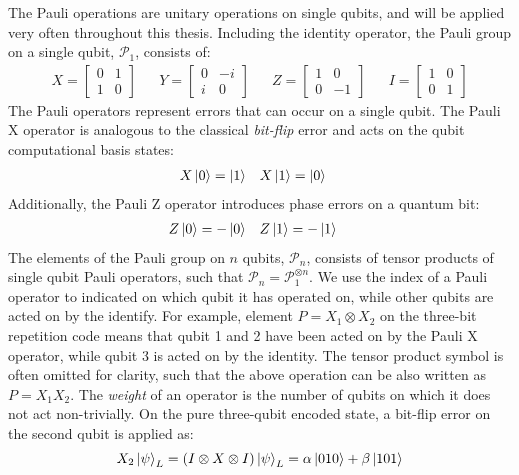 The Pauli operations are unitary operations on single qubits, and will be applied very often throughout this thesis. Including the identity operator, the Pauli group on a single qubit, $\mathcal{P}_1$, consists of:
\begin{align}
  X = \begin{bmatrix} 0 & 1 \\ 1 & 0 \end{bmatrix} &&
  Y = \begin{bmatrix} 0 & -i \\ i & 0 \end{bmatrix} &&
  Z = \begin{bmatrix} 1 & 0 \\ 0 & -1 \end{bmatrix} &&
  I = \begin{bmatrix} 1 & 0 \\ 0 & 1 \end{bmatrix}
\end{align}
The Pauli operators represent errors that can occur on a single qubit. The Pauli X operator is analogous to the classical \emph{bit-flip} error and acts on the qubit computational basis states:
\begin{align}\label{eqq:qec_bitflip}
  & X\ket{0} = \ket{1} && X\ket{1} = \ket{0} &
\end{align}
Additionally, the Pauli Z operator introduces phase errors on a quantum bit:
\begin{align}\label{eq:eqc_phaseflip}
  & Z\ket{0} = -\ket{0} && Z\ket{1} = -\ket{1} &
\end{align}
The elements of the Pauli group on $n$ qubits, $\mathcal{P}_n$, consists of tensor products of single qubit Pauli operators, such that  $\mathcal{P}_n = \mathcal{P}_1^{\otimes n}$. We use the index of a Pauli operator to indicated on which qubit it has operated on, while other qubits are acted on by the identify. For example, element $P=X_1\otimes X_2$ on the three-bit repetition code means that qubit 1 and 2 have been acted on by the Pauli X operator, while qubit 3 is acted on by the identity. The tensor product symbol is often omitted for clarity, such that the above operation can be also written as  $P=X_1X_2$. The \emph{weight} of an operator is the number of qubits on which it does not act non-trivially. On the pure  three-qubit encoded state, a bit-flip error on the second qubit is applied as:
\begin{equation}\label{eq:qec_3bitflip}
  X_2\ket{\psi}_L = (I\otimes X \otimes I) \ket{\psi}_L = \alpha\ket{010} + \beta\ket{101}
\end{equation}

